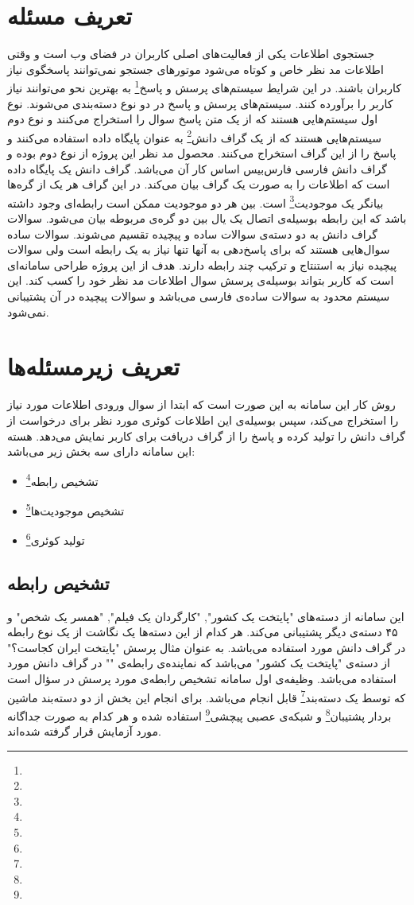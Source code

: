 \section{تعریف مسئله}
جستجوی اطلاعات یکی از فعالیت‌های اصلی کاربران در فضای وب است و وقتی اطلاعات مد نظر خاص و کوتاه می‌شود موتورهای جستجو نمی‌توانند پاسخگوی نیاز کاربران باشند. در این شرایط سیستم‌های پرسش و پاسخ\footnote{} به بهترین نحو می‌توانند نیاز کاربر را برآورده کنند.
سیستم‌های پرسش و پاسخ در دو نوع دسته‌بندی می‌شوند. نوع اول سیستم‌هایی هستند که از یک متن پاسخ سوال را استخراج می‌کنند و نوع دوم سیستم‌هایی هستند که از یک گراف دانش\footnote{} به عنوان پایگاه داده استفاده می‌کنند و پاسخ را از این گراف استخراج می‌کنند. محصول مد نظر این پروژه از نوع دوم بوده و گراف دانش فارسی فارس‌بیس اساس کار آن می‌باشد. 
گراف دانش یک پایگاه داده است که اطلاعات را به صورت یک گراف بیان می‌کند. در این گراف هر یک از گره‌ها بیانگر یک موجودیت\footnote{} است. بین هر دو موجودیت ممکن است رابطه‌ای وجود داشته باشد که این رابطه بوسیله‌ی اتصال یک یال بین دو گره‌ی مربوطه بیان می‌شود.
سوالات گراف دانش به دو دسته‌ی سوالات ساده و پیچیده تقسیم می‌شوند. سوالات ساده سوال‌هایی هستند که برای پاسخ‌دهی به آنها تنها نیاز به یک رابطه است ولی سوالات پیچیده نیاز به استنتاج و ترکیب چند رابطه دارند.
هدف از این پروژه طراحی سامانه‌ای است که کاربر بتواند بوسیله‌ی پرسش سوال اطلاعات مد نظر خود را کسب کند. این سیستم محدود به سوالات ساده‌ی فارسی می‌باشد و سوالات پیچیده در آن پشتیبانی نمی‌شود.

\section{تعریف زیرمسئله‌ها}
روش کار این سامانه به این صورت است که ابتدا از سوال ورودی اطلاعات مورد نیاز را استخراج می‌کند، سپس بوسیله‌ی این اطلاعات کوئری مورد نظر برای درخواست از گراف دانش را تولید کرده و پاسخ را از گراف دریافت برای کاربر نمایش می‌دهد. هسته این سامانه دارای سه بخش زیر می‌باشد:
\begin{itemize}
	\item تشخیص رابطه\footnote{}
	\item تشخیص موجودیت‌ها\footnote{}
	\item تولید کوئری\footnote{}
\end{itemize}

\subsection{تشخیص رابطه}
این سامانه از دسته‌های "پایتخت یک کشور", "کارگردان یک فیلم", "همسر یک شخص" و ۴۵ دسته‌ی دیگر پشتیبانی می‌کند. هر کدام از این دسته‌ها یک نگاشت از یک نوع رابطه در گراف دانش مورد استفاده می‌باشد.
به عنوان مثال پرسش "پایتخت ایران کجاست؟" از دسته‌ی "پایتخت یک کشور" می‌باشد که نماینده‌ی رابطه‌ی "" در گراف دانش مورد استفاده می‌باشد.
وظیفه‌ی اول سامانه تشخیص رابطه‌ی مورد پرسش در سؤال است که توسط یک دسته‌بند\footnote{} قابل انجام می‌باشد. برای انجام این بخش از دو دسته‌بند ماشین بردار پشتیبان\footnote{} و شبکه‌ی عصبی پیچشی\footnote{} استفاده شده و هر کدام به صورت جداگانه مورد آزمایش قرار گرفته شده‌اند.

